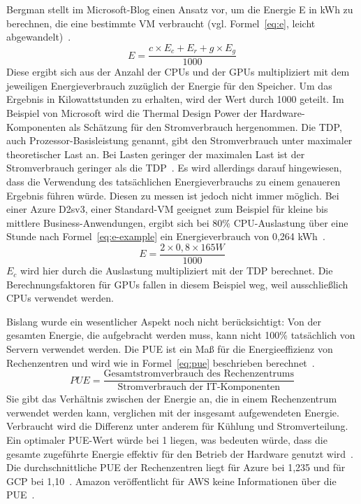 Bergman stellt im Microsoft-Blog einen Ansatz vor, um die Energie E in \ac{kWh} zu berechnen, die eine bestimmte \ac{VM} verbraucht (vgl. Formel~\ref{eq:e}, leicht abgewandelt)~\cite{Bergman.15.2.2021}.
\begin{equation}
 \label{eq:e}
 E = \frac{c \times E_c + E_r + g \times E_g}{1000}
\end{equation}
Diese ergibt sich aus der Anzahl der \acp{CPU} und der \acp{GPU} multipliziert mit dem jeweiligen Energieverbrauch zuzüglich der Energie für den Speicher.
Um das Ergebnis in Kilowattstunden zu erhalten, wird der Wert durch 1000 geteilt.
Im Beispiel von Microsoft wird die Thermal Design Power der Hardware-Komponenten als Schätzung für den Stromverbrauch hergenommen.
Die \ac{TDP}, auch Prozessor-Basisleistung genannt, gibt den Stromverbrauch unter maximaler theoretischer Last an.
Bei Lasten geringer der maximalen Last ist der Stromverbrauch geringer als die \ac{TDP}~\cite{Intel.20240317}.
Es wird allerdings darauf hingewiesen, dass die Verwendung des tatsächlichen Energieverbrauchs zu einem genaueren Ergebnis führen würde.
Diesen zu messen ist jedoch nicht immer möglich.
Bei einer Azure D2sv3, einer Standard-\ac{VM} geeignet zum Beispiel für kleine bis mittlere Business-Anwendungen, ergibt sich bei 80\% \ac{CPU}-Auslastung über eine Stunde nach Formel~\ref{eq:e-example} ein Energieverbrauch von 0,264 kWh~\cite{Bergman.15.2.2021}.
\begin{equation}
 \label{eq:e-example}
 E = \frac{2 \times 0,8 \times 165W}{1000}
\end{equation}
$E_c$ wird hier durch die Auslastung multipliziert mit der \ac{TDP} berechnet.
Die Berechnungsfaktoren für \acp{GPU} fallen in diesem Beispiel weg, weil ausschließlich \acp{CPU} verwendet werden.

Bislang wurde ein wesentlicher Aspekt noch nicht berücksichtigt:
Von der gesamten Energie, die aufgebracht werden muss, kann nicht 100\% tatsächlich von Servern verwendet werden.
Die \ac{PUE} ist ein Maß für die Energieeffizienz von Rechenzentren und wird wie in Formel~\ref{eq:pue} beschrieben berechnet~\cite{Walsh.22.4.2022}.
\begin{equation}
 \label{eq:pue}
 PUE = \frac{\text{Gesamtstromverbrauch des Rechenzentrums}}{\text{Stromverbrauch der IT-Komponenten}}
\end{equation}
Sie gibt das Verhältnis zwischen der Energie an, die in einem Rechenzentrum verwendet werden kann, verglichen mit der insgesamt aufgewendeten Energie.
Verbraucht wird die Differenz unter anderem für Kühlung und Stromverteilung.
Ein optimaler \ac{PUE}-Wert würde bei 1 liegen, was bedeuten würde, dass die gesamte zugeführte Energie effektiv für den Betrieb der Hardware genutzt wird~\cite{GreenSoftwareFoundation.2022}.
Die durchschnittliche \ac{PUE} der Rechenzentren liegt für Azure bei 1,235 und für \ac{GCP} bei 1,10~\cite{Walsh.22.4.2022}\cite{Google.20240312}.
Amazon veröffentlicht für \ac{AWS} keine Informationen über die \ac{PUE}~\cite{Cockcroft.18.7.2023}.

